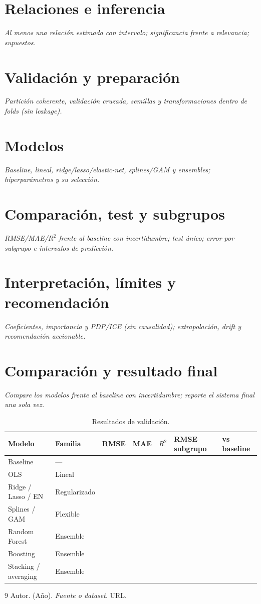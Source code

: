 \documentclass[titlepage,11pt,letterpaper]{article}
\newcommand{\instruccion}[1]{\par\smallskip\noindent\textit{\color{gray!75!black}#1}\par\smallskip}
\begin{document}
\section{Relaciones e inferencia}
\instruccion{Al menos una relación estimada con intervalo; significancia frente a relevancia; supuestos.}

\section{Validación y preparación}
\instruccion{Partición coherente, validación cruzada, semillas y transformaciones dentro de folds (sin leakage).}

\section{Modelos}
\instruccion{Baseline, lineal, ridge/lasso/elastic-net, splines/GAM y ensembles; hiperparámetros y su selección.}

\section{Comparación, test y subgrupos}
\instruccion{RMSE/MAE/$R^2$ frente al baseline con incertidumbre; test único; error por subgrupo e intervalos de predicción.}

\section{Interpretación, límites y recomendación}
\instruccion{Coeficientes, importancia y PDP/ICE (sin causalidad); extrapolación, drift y recomendación accionable.}

\section{Comparación y resultado final}
\instruccion{Compare los modelos frente al baseline con incertidumbre; reporte el sistema final una sola vez.}
\begin{table}[H]\centering\small
\caption{Resultados de validación.}
\begin{tabular}{lllllll}
\toprule
Modelo & Familia & RMSE & MAE & $R^2$ & RMSE subgrupo & vs baseline \\
\midrule
Baseline & --- & & & & & \\
OLS & Lineal & & & & & \\
Ridge / Lasso / EN & Regularizado & & & & & \\
Splines / GAM & Flexible & & & & & \\
Random Forest & Ensemble & & & & & \\
Boosting & Ensemble & & & & & \\
Stacking / averaging & Ensemble & & & & & \\
\bottomrule
\end{tabular}\end{table}
\begin{thebibliography}{9}
 Autor. (Año). \textit{Fuente o dataset}. URL.
\end{thebibliography}
\appendix
\end{document}
